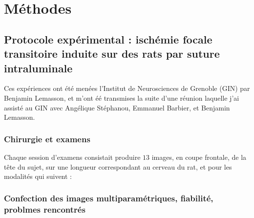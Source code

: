 \section{M\'ethodes}

\makeatletter
\renewcommand{\thefigure}{\ifnum \c@section>\z@ \thesection.\fi
 \@arabic\c@figure}
\makeatother
\begin{comment}
Remarque : pour renuméroter les sous-figures de la même manière
           (avec le package 'subfigure'), il suffit de rajouter
	   la ligne \let\p@subfigure\thefigure dans le préambule.
\end{comment}

\subsection{Protocole exp\'erimental : isch\'emie focale transitoire induite sur des rats par suture intraluminale}

Ces exp\'eriences ont \'et\'e men\'ees  l'Institut de Neurosciences de Grenoble (GIN) par Benjamin Lemasson, %
et m'ont \'e\'e transmises  la suite d'une r\'eunion  laquelle j'ai assist\'e au GIN %
avec Ang\'elique St\'ephanou, Emmanuel Barbier, et Benjamin Lemasson.



\subsubsection{Chirurgie et examens}



Chaque session d'examens consistait  produire $13$ images, en coupe frontale, de la t\^ete du sujet, %
sur une longueur correspondant au cerveau du rat, et pour les modalit\'es qui suivent :

\subsubsection{Confection des images multiparam\'etriques, fiabilit\'e, problmes rencontr\'es}





